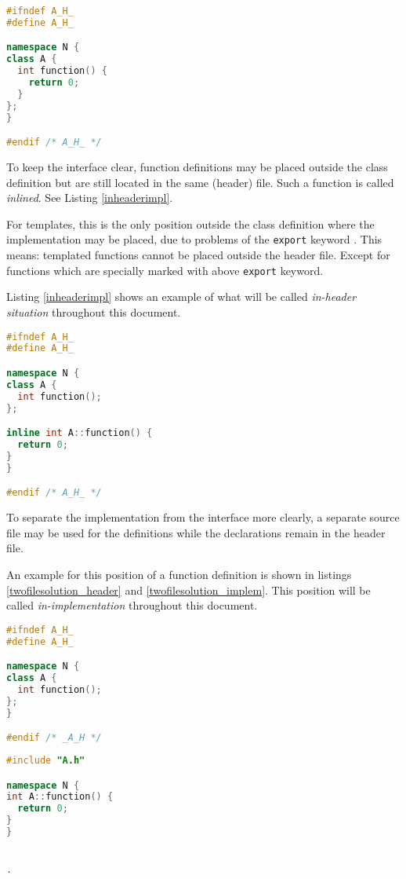 \begin{lstlisting}[caption={In-class implementation in A.h},
label={classheaderimpl}, language=C++ ]
#ifndef A_H_
#define A_H_

namespace N {
class A {
  int function() {
    return 0;
  }
};
}

#endif /* A_H_ */
\end{lstlisting}

To keep the interface clear, function definitions may be placed outside the
class definition but are still located in the same (header) file. Such a
function is called \textit{inlined}. See Listing \ref{inheaderimpl}.\newline

For templates, this is the only position outside the class definition where
the implementation may be placed, due to problems of the \texttt{export} keyword
\cite{ext03}. This means: templated functions cannot be placed outside the
header file. Except for functions which are specially marked with above
\texttt{export} keyword.

Listing \ref{inheaderimpl} shows an example of what will be
called \textit{in-header situation} throughout this document.

\begin{lstlisting}[caption={In-header implementation in A.h},
label={inheaderimpl}, language=C++ ]
#ifndef A_H_
#define A_H_

namespace N {
class A {
  int function();
};

inline int A::function() {
  return 0;
}
}

#endif /* A_H_ */
\end{lstlisting}

To separate the implementation from the interface more clearly, a separate
source file may be used for the definitions while the declarations remain in the
header file.

An example for this position of a function definition is shown in
listings \ref{twofilesolution_header} and \ref{twofilesolution_implem}. This
position will be called \textit{in-implementation} throughout this document.

\vspace{0.5cm}
\begin{minipage}{.48\textwidth}
\lstset{xrightmargin=0.5cm}
\begin{lstlisting}[caption={A.h, with declaration},
label={twofilesolution_header}, language=C++]
#ifndef A_H_
#define A_H_

namespace N {
class A {
  int function();
};
}

#endif /* _A_H */
\end{lstlisting}
\end{minipage}%
\begin{minipage}{.48\textwidth}
\lstset{xleftmargin=0.5cm}
\begin{lstlisting}[caption={A.cpp, with definition},
label={twofilesolution_implem}, language=C++]
#include "A.h"

namespace N {
int A::function() { 
  return 0;
}
}


.
\end{lstlisting}
\end{minipage}

